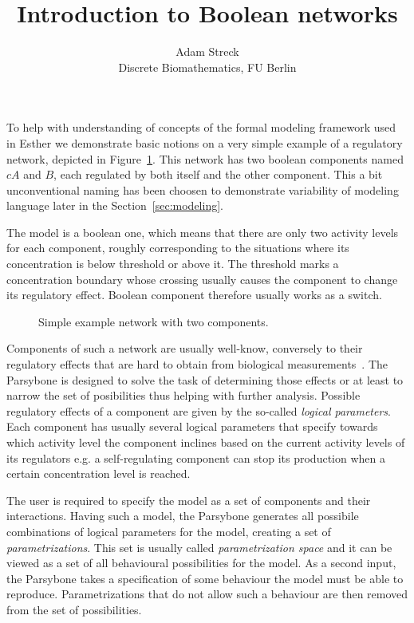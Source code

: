 \documentclass[12pt]{article}
\title{Introduction to Boolean networks}
\author{Adam Streck \\
		Discrete Biomathematics, FU Berlin}
\begin{document}
\maketitle


To help with understanding of concepts of the formal modeling framework used in Esther we demonstrate basic notions on a very simple example of a regulatory network, depicted in Figure~\ref{ExampNet}. This network has two boolean components named $cA$ and $B$, each regulated by both itself and the other component. This a bit unconventional naming has been choosen to demonstrate variability of modeling language later in the Section~\ref{sec:modeling}.

The model is a boolean one, which means that there are only two activity levels for each component, roughly corresponding to the situations where its concentration is below threshold or above it. The threshold marks a concentration boundary whose crossing usually causes the component to change its regulatory effect. Boolean component therefore usually works as a switch.

\begin{figure}[b]
\centering
{}
\caption{Simple example network with two components.}
\label{ExampNet}
\end{figure}

Components of such a network are usually well-know, conversely to their regulatory effects that are hard to obtain from biological measurements~\cite{Hecker09}. The Parsybone is designed to solve the task of determining those effects or at least to narrow the set of posibilities thus helping with further analysis. Possible regulatory effects of a component are given by the so-called \emph{logical parameters}. Each component has usually several logical parameters that specify towards which activity level the component inclines based on the current activity levels of its regulators e.g. a self-regulating component can stop its production when a certain concentration level is reached.

The user is required to specify the model as a set of components and their interactions. Having such a model, the Parsybone generates all possibile combinations of logical parameters for the model, creating a set of \emph{parametrizations}. This set is usually called \emph{parametrization space} and it can be viewed as a set of all behavioural possibilities for the model. As a second input, the Parsybone takes a specification of some behaviour the model must be able to reproduce. Parametrizations that do not allow such a behaviour are then removed from the set of possibilities.
\end{document}
